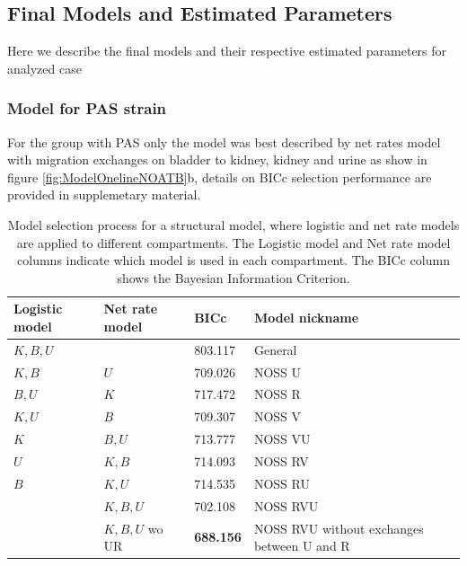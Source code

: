 \documentclass{article}
\begin{document}

\subsection{Final Models and Estimated Parameters}

Here we describe the final models and their respective estimated parameters for analyzed case


\subsubsection{Model for PAS strain}

For the group with PAS only the model was best described by net rates model with 
migration exchanges on bladder to kidney, kidney and urine as show in figure \ref{fig:ModelOnelineNOATB}b, details on BICc selection performance are provided in supplemetary material.


\begin{table}
	\begin{tabular}{|l|l|l|l|}
		\hline
		Logistic model & Net rate model & BICc & Model nickname\\ \hline
		$K, B, U$ &           & 803.117 & General \\
		$K, B   $ & $U   $ & 709.026 & NOSS U \\
		$B, U   $ & $K      $ & 717.472 & NOSS R \\
		$K, U   $ & $B      $ & 709.307 & NOSS V \\
		$K      $ & $B, U   $ & 713.777 & NOSS VU \\
		$U      $ & $K, B   $ & 714.093 & NOSS RV \\
		$B      $ & $K, U   $ & 714.535 & NOSS RU \\
		& $K, B, U$ & 702.108 & NOSS RVU \\
		$       $ & $K, B, U$ wo UR & \textbf{688.156} & NOSS RVU without exchanges between U and R \\
		\hline
	\end{tabular}
	\label{tab:ModelSelectionPASLogvsNet}
	\caption{Model selection process for a structural model, where logistic and net rate models are applied to different compartments. The Logistic model and Net rate model columns indicate which model is used in each compartment. The BICc column shows the Bayesian Information Criterion. }
\end{table}
\end{document}
